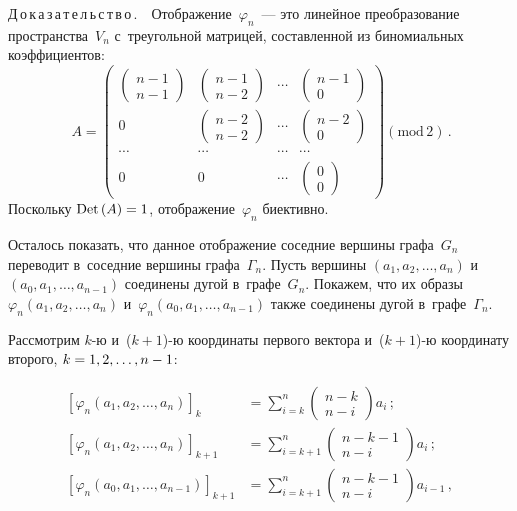 \begin{multicols}{2}
\noindent
  Д\,о\,к\,а\,з\,а\,т\,е\,л\,ь\,с\,т\,в\,о\,.\ \ Отображение~$\varphi_n$~--- это 
линейное преобразование пространства~$V_n$ с~треугольной матрицей, 
составленной из биномиальных коэффициентов:
  $$\
  A=\left(
  \begin{array}{cccc}
  \begin{pmatrix} n-1\\ n-1\end{pmatrix}&
  \begin{pmatrix} n-1\\ n-2\end{pmatrix} &\cdots& \begin{pmatrix} n-1\\ 
0\end{pmatrix}\\[9pt]
  0&\begin{pmatrix} n-2\\ n-2\end{pmatrix} & \cdots & 
  \begin{pmatrix} n-2\\ 0\end{pmatrix}\\[6pt]
  \cdots &\cdots &\cdots &\cdots\\[6pt]
 0& 0 &\cdots &\begin{pmatrix}  0 \\ 0\end{pmatrix}
  \end{array}
  \right) 
  \left( \mathrm{mod}\,2\right)\,.
    $$
  Поскольку $\mathrm{Det}\,(A)\hm=1$, отображение~$\varphi_n$ биективно.
  
  Осталось показать, что данное отображение соседние вершины графа~$G_n$ 
переводит в~соседние вершины графа~$\Gamma_n$. Пусть вершины $(a_1, a_2, 
\ldots , a_n)$ и~$(a_0, a_1,\ldots , a_{n-1})$ соединены дугой в~графе~$G_n$. 
Покажем, что их образы $\varphi_n (a_1, a_2, \ldots , a_n)$ 
и~$\varphi_n(a_0,a_1,\ldots , a_{n-1})$ также соединены дугой 
в~графе~$\Gamma_n$.
  
  Рассмотрим $k$-ю и~($k+1$)-ю координаты первого вектора  
и~($k +1$)-ю координату второго, $k\hm= 1,2,\ldots , n-1$:

\noindent
  \begin{align*}
  \left[ \varphi_n\left(a_1,a_2,\ldots ,a_n\right)\right]_k&= \sum\limits_{i=k}^n 
\begin{pmatrix}
  n-k\\ n-i\end{pmatrix} a_i\,;\\
  \left[ \varphi_n\left(a_1,a_2,\ldots ,a_n\right)\right]_{k+1}&= 
\sum\limits_{i=k+1}^n \begin{pmatrix}
  n-k-1\\ n-i\end{pmatrix} a_i\,;\\
  \left[ \varphi_n\left(a_0,a_1,\ldots , 
a_{n-1}\right)\right]_{k+1}&= \displaystyle\sum\limits_{i=k+1}^n \begin{pmatrix}
  n-k-1\\ n-i\end{pmatrix} a_{i-1}\,,\\
  \end{align*}
  

\end{multicols}
